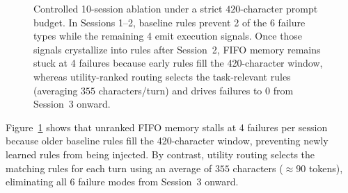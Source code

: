 \documentclass[11pt,a4paper]{article}
\begin{document}
\begin{figure}[!t]
\centering
{}
\caption{Controlled 10-session ablation under a strict $420$-character prompt budget. In Sessions 1--2, baseline rules prevent 2 of the 6 failure types while the remaining 4 emit execution signals. Once those signals crystallize into rules after Session~2, FIFO memory remains stuck at 4 failures because early rules fill the 420-character window, whereas utility-ranked routing selects the task-relevant rules (averaging $355$ characters/turn) and drives failures to $0$ from Session~3 onward.}
\label{fig:evolution_curve}
\end{figure}

Figure~\ref{fig:evolution_curve} shows that unranked FIFO memory stalls at 4 failures per session because older baseline rules fill the 420-character window, preventing newly learned rules from being injected. By contrast, utility routing selects the matching rules for each turn using an average of $355$ characters ($\approx 90$ tokens), eliminating all 6 failure modes from Session~3 onward.
\end{document}
